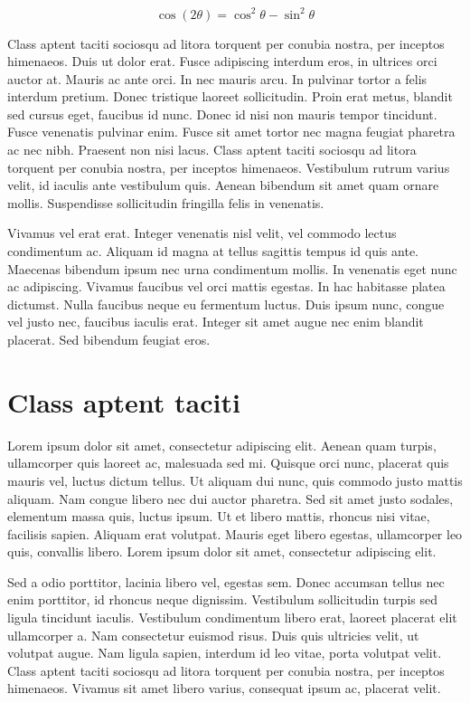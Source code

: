 \documentclass[doutorado,rascunho]{fei}
\begin{document}
\begin{equation}
\cos (2\theta) = \cos^2 \theta - \sin^2 \theta
\end{equation}

Class aptent taciti sociosqu ad litora torquent per conubia nostra, per inceptos himenaeos. Duis ut dolor erat. Fusce adipiscing interdum eros, in ultrices orci auctor at. Mauris ac ante orci. In nec mauris arcu. In pulvinar tortor a felis interdum pretium. Donec tristique laoreet sollicitudin. Proin erat metus, blandit sed cursus eget, faucibus id nunc. Donec id nisi non mauris tempor tincidunt. Fusce venenatis pulvinar enim. Fusce sit amet tortor nec magna feugiat pharetra ac nec nibh. Praesent non nisi lacus. Class aptent taciti sociosqu ad litora torquent per conubia nostra, per inceptos himenaeos. Vestibulum rutrum varius velit, id iaculis ante vestibulum quis. Aenean bibendum sit amet quam ornare mollis. Suspendisse sollicitudin fringilla felis in venenatis.

Vivamus vel erat erat. Integer venenatis nisl velit, vel commodo lectus condimentum ac. Aliquam id magna at tellus sagittis tempus id quis ante. Maecenas bibendum ipsum nec urna condimentum mollis. In venenatis eget nunc ac adipiscing. Vivamus faucibus vel orci mattis egestas. In hac habitasse platea dictumst. Nulla faucibus neque eu fermentum luctus. Duis ipsum nunc, congue vel justo nec, faucibus iaculis erat. Integer sit amet augue nec enim blandit placerat. Sed bibendum feugiat eros.

\section{Class aptent taciti}

Lorem ipsum dolor sit amet, consectetur adipiscing elit. Aenean quam turpis, ullamcorper quis laoreet ac, malesuada sed mi. Quisque orci nunc, placerat quis mauris vel, luctus dictum tellus. Ut aliquam dui nunc, quis commodo justo mattis aliquam. Nam congue libero nec dui auctor pharetra. Sed sit amet justo sodales, elementum massa quis, luctus ipsum. Ut et libero mattis, rhoncus nisi vitae, facilisis sapien. Aliquam erat volutpat. Mauris eget libero egestas, ullamcorper leo quis, convallis libero. Lorem ipsum dolor sit amet, consectetur adipiscing elit.

Sed a odio porttitor, lacinia libero vel, egestas sem. Donec accumsan tellus nec enim porttitor, id rhoncus neque dignissim. Vestibulum sollicitudin turpis sed ligula tincidunt iaculis. Vestibulum condimentum libero erat, laoreet placerat elit ullamcorper a. Nam consectetur euismod risus. Duis quis ultricies velit, ut volutpat augue. Nam ligula sapien, interdum id leo vitae, porta volutpat velit. Class aptent taciti sociosqu ad litora torquent per conubia nostra, per inceptos himenaeos. Vivamus sit amet libero varius, consequat ipsum ac, placerat velit.
\end{document}
